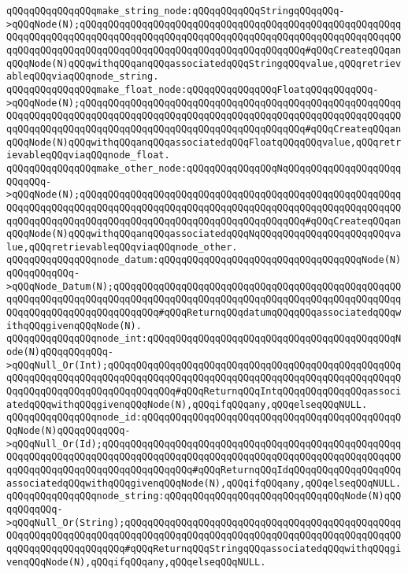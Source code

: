 \verb|qQQqqQQqqQQqqQQqmake_string_node:qQQqqQQqqQQqStringqQQqqQQq->qQQqNode(N);qQQqqQQqqQQqqQQqqQQqqQQqqQQqqQQqqQQqqQQqqQQqqQQqqQQqqQQqqQQqqQQqqQQqqQQqqQQqqQQqqQQqqQQqqQQqqQQqqQQqqQQqqQQqqQQqqQQqqQQqqQQqqQQqqQQqqQQqqQQqqQQqqQQqqQQqqQQqqQQqqQQqqQQqqQQqqQQqqQQq#qQQqCreateqQQqanqQQqNode(N)qQQqwithqQQqanqQQqassociatedqQQqStringqQQqvalue,qQQqretrievableqQQqviaqQQqnode_string.|\newline
\verb|qQQqqQQqqQQqqQQqmake_float_node:qQQqqQQqqQQqqQQqFloatqQQqqQQqqQQq->qQQqNode(N);qQQqqQQqqQQqqQQqqQQqqQQqqQQqqQQqqQQqqQQqqQQqqQQqqQQqqQQqqQQqqQQqqQQqqQQqqQQqqQQqqQQqqQQqqQQqqQQqqQQqqQQqqQQqqQQqqQQqqQQqqQQqqQQqqQQqqQQqqQQqqQQqqQQqqQQqqQQqqQQqqQQqqQQqqQQqqQQqqQQq#qQQqCreateqQQqanqQQqNode(N)qQQqwithqQQqanqQQqassociatedqQQqFloatqQQqqQQqvalue,qQQqretrievableqQQqviaqQQqnode_float.|\newline
\verb|qQQqqQQqqQQqqQQqmake_other_node:qQQqqQQqqQQqqQQqNqQQqqQQqqQQqqQQqqQQqqQQqqQQq->qQQqNode(N);qQQqqQQqqQQqqQQqqQQqqQQqqQQqqQQqqQQqqQQqqQQqqQQqqQQqqQQqqQQqqQQqqQQqqQQqqQQqqQQqqQQqqQQqqQQqqQQqqQQqqQQqqQQqqQQqqQQqqQQqqQQqqQQqqQQqqQQqqQQqqQQqqQQqqQQqqQQqqQQqqQQqqQQqqQQqqQQqqQQq#qQQqCreateqQQqanqQQqNode(N)qQQqwithqQQqanqQQqassociatedqQQqNqQQqqQQqqQQqqQQqqQQqqQQqvalue,qQQqretrievableqQQqviaqQQqnode_other.|\newline
\newline
\verb|qQQqqQQqqQQqqQQqnode_datum:qQQqqQQqqQQqqQQqqQQqqQQqqQQqqQQqqQQqNode(N)qQQqqQQqqQQq->qQQqNode_Datum(N);qQQqqQQqqQQqqQQqqQQqqQQqqQQqqQQqqQQqqQQqqQQqqQQqqQQqqQQqqQQqqQQqqQQqqQQqqQQqqQQqqQQqqQQqqQQqqQQqqQQqqQQqqQQqqQQqqQQqqQQqqQQqqQQqqQQqqQQqqQQqqQQqqQQq#qQQqReturnqQQqdatumqQQqqQQqassociatedqQQqwithqQQqgivenqQQqNode(N).|\newline
\verb|qQQqqQQqqQQqqQQqnode_int:qQQqqQQqqQQqqQQqqQQqqQQqqQQqqQQqqQQqqQQqqQQqNode(N)qQQqqQQqqQQq->qQQqNull_Or(Int);qQQqqQQqqQQqqQQqqQQqqQQqqQQqqQQqqQQqqQQqqQQqqQQqqQQqqQQqqQQqqQQqqQQqqQQqqQQqqQQqqQQqqQQqqQQqqQQqqQQqqQQqqQQqqQQqqQQqqQQqqQQqqQQqqQQqqQQqqQQqqQQqqQQqqQQq#qQQqReturnqQQqIntqQQqqQQqqQQqqQQqassociatedqQQqwithqQQqgivenqQQqNode(N),qQQqifqQQqany,qQQqelseqQQqNULL.|\newline
\verb|qQQqqQQqqQQqqQQqnode_id:qQQqqQQqqQQqqQQqqQQqqQQqqQQqqQQqqQQqqQQqqQQqqQQqNode(N)qQQqqQQqqQQq->qQQqNull_Or(Id);qQQqqQQqqQQqqQQqqQQqqQQqqQQqqQQqqQQqqQQqqQQqqQQqqQQqqQQqqQQqqQQqqQQqqQQqqQQqqQQqqQQqqQQqqQQqqQQqqQQqqQQqqQQqqQQqqQQqqQQqqQQqqQQqqQQqqQQqqQQqqQQqqQQqqQQqqQQq#qQQqReturnqQQqIdqQQqqQQqqQQqqQQqqQQqassociatedqQQqwithqQQqgivenqQQqNode(N),qQQqifqQQqany,qQQqelseqQQqNULL.|\newline
\verb|qQQqqQQqqQQqqQQqnode_string:qQQqqQQqqQQqqQQqqQQqqQQqqQQqqQQqNode(N)qQQqqQQqqQQq->qQQqNull_Or(String);qQQqqQQqqQQqqQQqqQQqqQQqqQQqqQQqqQQqqQQqqQQqqQQqqQQqqQQqqQQqqQQqqQQqqQQqqQQqqQQqqQQqqQQqqQQqqQQqqQQqqQQqqQQqqQQqqQQqqQQqqQQqqQQqqQQqqQQqqQQq#qQQqReturnqQQqStringqQQqassociatedqQQqwithqQQqgivenqQQqNode(N),qQQqifqQQqany,qQQqelseqQQqNULL.|\newline
